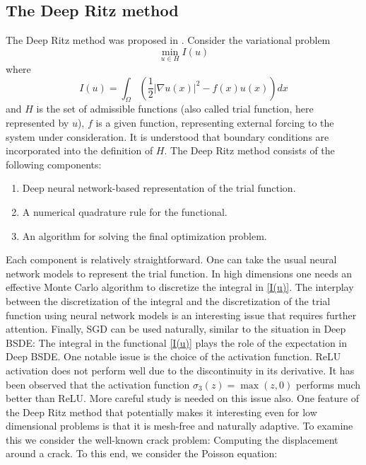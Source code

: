 \documentclass[12pt,AutoFakeBold,AutoFakeSlant]{article}
\theoremstyle{definition}
\begin{document}
	\subsection{The Deep Ritz method}
	The Deep Ritz method was proposed in \cite{E2018deep}.
	Consider the variational problem \cite{Evans2010partial}
	\begin{equation}
	\min_{u \in H} I(u)
	\end{equation}
	where
	\begin{equation}
	I(u) = \int_{\Omega} \left( \frac 12  |\nabla u(x)|^2 -  f(x) u(x) \right) dx
	\label{I(u)}
	\end{equation}
	and $H$ is the set of admissible functions (also called
	trial function, here represented by $u$),
	$f$ is a given function, representing
	external forcing to the system under consideration.
	It is understood that boundary conditions are incorporated into the definition of $H$.
	The Deep Ritz method consists of the following components:
	\begin{enumerate}
	\item Deep neural network-based representation of the trial function.
	\item A numerical quadrature rule for the functional.
	\item An algorithm for solving the final optimization problem.
	\end{enumerate}
	Each component is relatively straightforward. One can take the usual neural network
	models to represent the trial function. 
	In high dimensions one needs an effective 
	Monte Carlo algorithm to discretize the integral in \eqref{I(u)}.
	The interplay between the discretization of the integral and the discretization of the trial
	function using neural network models is an interesting issue that requires further attention.
	Finally, SGD can be used naturally, similar to the situation in Deep BSDE: The integral
	in the functional \eqref{I(u)} plays the role of the expectation in Deep BSDE.
	One notable issue is the choice of the activation function. ReLU activation does not perform well
	due to the discontinuity in its derivative.
	It has been observed that the activation function $\sigma_3 (z) = \max (z, 0)$ performs
	much better than ReLU.  More careful study is needed on this issue also.
	One feature of the Deep Ritz method that potentially makes it interesting even
	for low dimensional problems is that it is mesh-free and naturally adaptive.
	To examine this we consider the well-known crack problem: Computing the displacement 
	around a crack.  To this end, we consider the Poisson equation:
\end{document}
